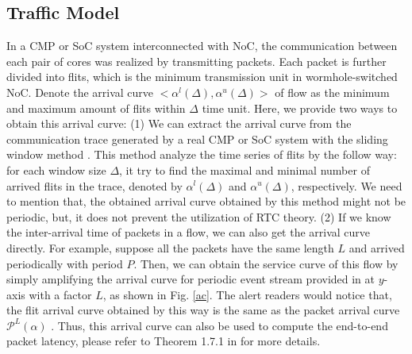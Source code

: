 \documentclass[10pt,journal]{IEEEtran}
\begin{document}
\subsection{Traffic Model}\label{traffic}
In a CMP or SoC system interconnected with NoC, the communication between each pair of cores was realized by transmitting packets. Each packet is further divided into flits, which is the minimum transmission unit in wormhole-switched NoC. Denote the arrival curve $<\alpha^l(\Delta),\alpha^u(\Delta)>$ of flow as the minimum and maximum amount of flits within $\Delta$ time unit. Here, we provide two ways to obtain this arrival curve: (1) We can extract the arrival curve from the communication trace generated by a real CMP or SoC system with the sliding window method \cite{1253607}. This method analyze the time series of flits by the follow way: for each window size $\Delta$, it try to find the maximal and minimal number of arrived flits in the trace, denoted by $\alpha^l(\Delta)$ and $\alpha^u(\Delta)$, respectively. We need to mention that, the obtained arrival curve obtained by this method might not be periodic, but, it does not prevent the utilization of RTC theory. (2) If we know the inter-arrival time of packets in a flow, we can also get the arrival curve directly. For example, suppose all the packets have the same length $L$ and arrived periodically with period $P$. Then, we can obtain the service curve of this flow by simply amplifying the arrival curve for periodic event stream provided in \cite{1253607} at $y$-axis with a factor $L$, as shown in Fig. \ref{ac}. The alert readers would notice that, the flit arrival curve obtained by this way is the same as the packet arrival curve $\mathcal{P}^L(\alpha)$ \cite{Boudec2001Network}. Thus, this arrival curve can also be used to compute the end-to-end packet latency, please refer to Theorem 1.7.1 in \cite{Boudec2001Network} for more details.
\end{document}
